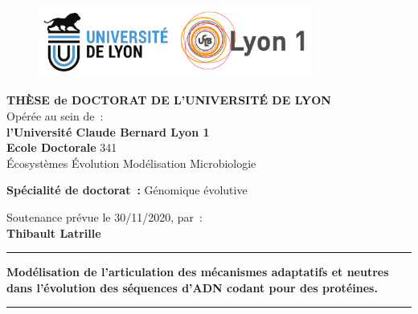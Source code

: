 \thispagestyle{empty}

\unitlength 1cm
\begin{center}

    \vspace*{-2.5cm}
    \begin{figure}[h]
        \centering
        \includegraphics[width=0.8\textwidth]{figures/logo-UdL-UCB}
    \end{figure}

    {\large \textbf{THÈSE de DOCTORAT DE L'UNIVERSITÉ DE LYON}\\}
    {Opérée au sein de~:\\}
    {\large \textbf{l'Université Claude Bernard Lyon 1}\\}
    \vspace{12pt}
    {\large \textbf{Ecole Doctorale} 341 \\
    \vspace{0.15cm}
    Écosystèmes Évolution Modélisation Microbiologie
    }
    
    \vspace{12pt}

    {\large \textbf{Spécialité de doctorat~:} Génomique évolutive
    \\}

    \vspace{0.8cm}

    {Soutenance prévue le 30/11/2020, par~:\\}
    \vspace{0.15cm}
    {\Large \textbf{Thibault Latrille}}
    \vspace{0.5cm}

    \rule{5cm}{1pt}
    \vspace{12pt}

    {\huge \textbf{Modélisation de l'articulation des mécanismes adaptatifs et neutres dans l’évolution des séquences d’ADN codant pour des protéines.}\par}

    \vspace{12pt}
    \rule{5cm}{1pt}

    \vspace{0.5cm}

\end{center}

